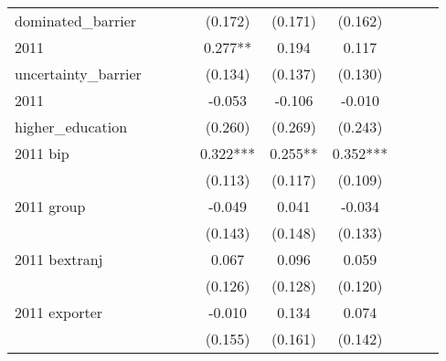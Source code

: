 \begin{table}[htbp]
\begin{tabular}{l*{9}{c}}
dominated\_barrier   &               &               &               &     (0.172)   &     (0.171)   &     (0.162)   &               &               &               \\
2011                &               &               &               &       0.277** &       0.194   &       0.117   &               &               &               \\
uncertainty\_barrier &               &               &               &     (0.134)   &     (0.137)   &     (0.130)   &               &               &               \\
2011                &               &               &               &      -0.053   &      -0.106   &      -0.010   &               &               &               \\
higher\_education    &               &               &               &     (0.260)   &     (0.269)   &     (0.243)   &               &               &               \\
2011 bip            &               &               &               &       0.322***&       0.255** &       0.352***&               &               &               \\
                    &               &               &               &     (0.113)   &     (0.117)   &     (0.109)   &               &               &               \\
2011 group          &               &               &               &      -0.049   &       0.041   &      -0.034   &               &               &               \\
                    &               &               &               &     (0.143)   &     (0.148)   &     (0.133)   &               &               &               \\
2011 bextranj       &               &               &               &       0.067   &       0.096   &       0.059   &               &               &               \\
                    &               &               &               &     (0.126)   &     (0.128)   &     (0.120)   &               &               &               \\
2011 exporter       &               &               &               &      -0.010   &       0.134   &       0.074   &               &               &               \\
                    &               &               &               &     (0.155)   &     (0.161)   &     (0.142)   &               &               &               \\

\end{tabular}
\end{table}
